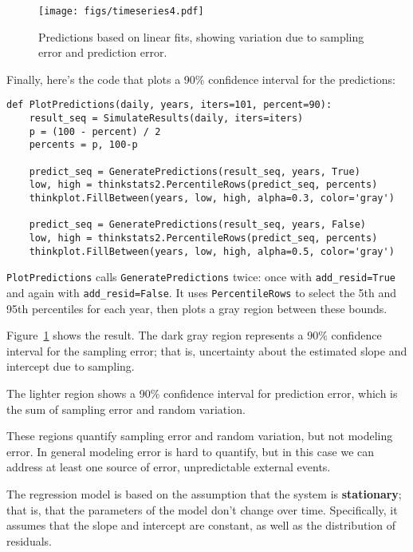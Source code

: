 \begin{figure}
\centerline{\texttt{[image: figs/timeseries4.pdf]}}
\caption{Predictions based on linear fits, showing variation due
to sampling error and prediction error.}
\label{timeseries4}
\end{figure}

Finally, here's the code that plots a 90\% confidence interval for
the predictions:

\begin{verbatim}
def PlotPredictions(daily, years, iters=101, percent=90):
    result_seq = SimulateResults(daily, iters=iters)
    p = (100 - percent) / 2
    percents = p, 100-p

    predict_seq = GeneratePredictions(result_seq, years, True)
    low, high = thinkstats2.PercentileRows(predict_seq, percents)
    thinkplot.FillBetween(years, low, high, alpha=0.3, color='gray')

    predict_seq = GeneratePredictions(result_seq, years, False)
    low, high = thinkstats2.PercentileRows(predict_seq, percents)
    thinkplot.FillBetween(years, low, high, alpha=0.5, color='gray')
\end{verbatim}

{\tt PlotPredictions} calls {\tt GeneratePredictions} twice: once
with \verb"add_resid=True" and again with \verb"add_resid=False".
It uses {\tt PercentileRows} to select the 5th and 95th percentiles
for each year, then plots a gray region between these bounds.

Figure~\ref{timeseries4} shows the result.
The dark gray region represents a 90\% confidence interval for
the sampling error; that is, uncertainty about the estimated
slope and intercept due to sampling.

The lighter region shows
a 90\% confidence interval for prediction error, which is the
sum of sampling error and random variation.

These regions quantify sampling error and random variation, but
not modeling error.  In general modeling error is hard to quantify,
but in this case we can address at least one source of error,
unpredictable external events.

The regression model is based on the assumption that the system
is {\bf stationary}; that is, that the parameters of the model
don't change over time.
Specifically, it assumes that the slope and
intercept are constant, as well as the distribution of residuals.


